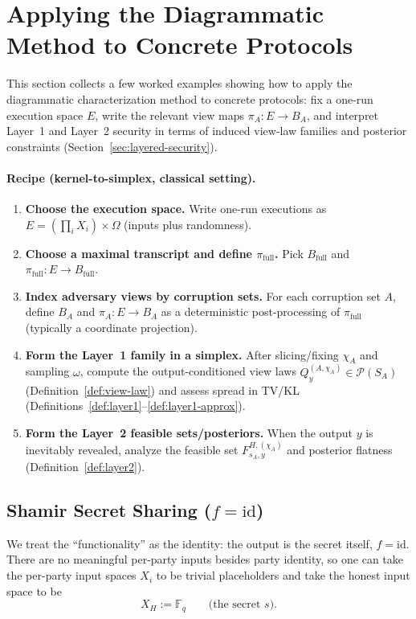 \documentclass[11pt,a4paper]{article}
\theoremstyle{definition}
\theoremstyle{plain}
\newcommand{\F}{\mathbb{F}}
\newcommand{\Prob}{\mathcal{P}}
\begin{document}
\clearpage

\section{Applying the Diagrammatic Method to Concrete Protocols}
\label{sec:protocol-applications}
This section collects a few worked examples showing how to apply the diagrammatic characterization method to concrete protocols: fix a one-run execution space $E$, write the relevant view maps $\pi_A:E\to B_A$, and interpret Layer~1 and Layer~2 security in terms of induced view-law families and posterior constraints (Section~\ref{sec:layered-security}).

\paragraph{Recipe (kernel-to-simplex, classical setting).}
\begin{enumerate}[label=\textbf{P.\arabic*}]
    \item \textbf{Choose the execution space.} Write one-run executions as $E=(\prod_i X_i)\times \Omega$ (inputs plus randomness).
    \item \textbf{Choose a maximal transcript and define $\pi_{\mathrm{full}}$.} Pick $B_{\mathrm{full}}$ and $\pi_{\mathrm{full}}:E\to B_{\mathrm{full}}$.
    \item \textbf{Index adversary views by corruption sets.} For each corruption set $A$, define $B_A$ and $\pi_A:E\to B_A$ as a deterministic post-processing of $\pi_{\mathrm{full}}$ (typically a coordinate projection).
    \item \textbf{Form the Layer~1 family in a simplex.} After slicing/fixing $\chi_A$ and sampling $\omega$, compute the output-conditioned view laws $Q_y^{(A,\chi_A)}\in\Prob(S_A)$ (Definition~\ref{def:view-law}) and assess spread in TV/KL (Definitions~\ref{def:layer1}--\ref{def:layer1-approx}).
    \item \textbf{Form the Layer~2 feasible sets/posteriors.} When the output $y$ is inevitably revealed, analyze the feasible set $F^{H,(\chi_A)}_{s_A,y}$ and posterior flatness (Definition~\ref{def:layer2}).
\end{enumerate}

\subsection{Shamir Secret Sharing (\texorpdfstring{$f=\mathrm{id}$}{f=id})}
\label{subsec:protocol-shamir}
We treat the ``functionality'' as the identity: the output is the secret itself, $f=\mathrm{id}$.
There are no meaningful per-party inputs besides party identity, so one can take the per-party input spaces $X_i$ to be trivial placeholders and take the honest input space to be
\[
X_H:=\F_q\qquad\text{(the secret }s\text{)}.
\]
\end{document}
